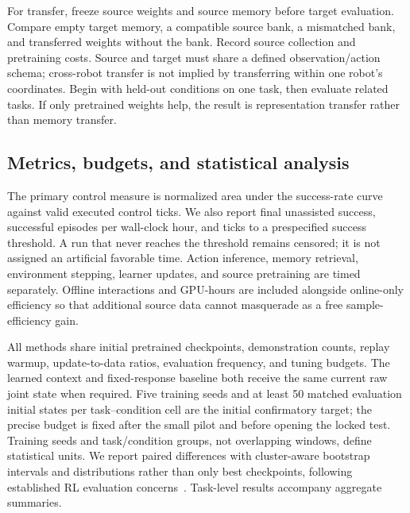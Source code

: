 \documentclass[10pt,letterpaper]{article}
\begin{document}
For transfer, freeze source weights and source memory before target evaluation. Compare empty target memory, a compatible source bank, a mismatched bank, and transferred weights without the bank. Record source collection and pretraining costs. Source and target must share a defined observation/action schema; cross-robot transfer is not implied by transferring within one robot's coordinates. Begin with held-out conditions on one task, then evaluate related tasks. If only pretrained weights help, the result is representation transfer rather than memory transfer.

\subsection{Metrics, budgets, and statistical analysis}
The primary control measure is normalized area under the success-rate curve against valid executed control ticks. We also report final unassisted success, successful episodes per wall-clock hour, and ticks to a prespecified success threshold. A run that never reaches the threshold remains censored; it is not assigned an artificial favorable time. Action inference, memory retrieval, environment stepping, learner updates, and source pretraining are timed separately. Offline interactions and GPU-hours are included alongside online-only efficiency so that additional source data cannot masquerade as a free sample-efficiency gain.

All methods share initial pretrained checkpoints, demonstration counts, replay warmup, update-to-data ratios, evaluation frequency, and tuning budgets. The learned context and fixed-response baseline both receive the same current raw joint state when required. Five training seeds and at least 50 matched evaluation initial states per task--condition cell are the initial confirmatory target; the precise budget is fixed after the small pilot and before opening the locked test. Training seeds and task/condition groups, not overlapping windows, define statistical units. We report paired differences with cluster-aware bootstrap intervals and distributions rather than only best checkpoints, following established RL evaluation concerns~\citep{rliable}. Task-level results accompany aggregate summaries.
\end{document}
